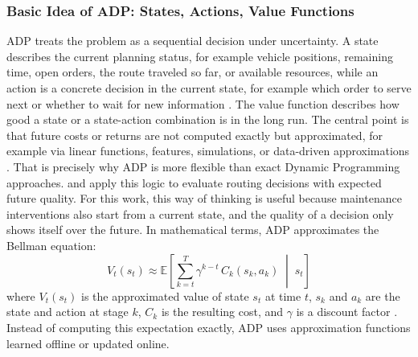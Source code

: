 \documentclass[12pt,oneside]{article}
\begin{document}
\subsubsection{Basic Idea of ADP: States, Actions, Value Functions}
ADP treats the problem as a sequential decision under uncertainty. A state describes the current planning status, for example vehicle positions, remaining time, open orders, the route traveled so far, or available resources, while an action is a concrete decision in the current state, for example which order to serve next or whether to wait for new information \citep{ulmer2017approximate, ulmer2019offline}.
The value function describes how good a state or a state-action combination is in the long run. The central point is that future costs or returns are not computed exactly but approximated, for example via linear functions, features, simulations, or data-driven approximations \citep{ulmer2017approximate, ulmer2020horizontal}. That is precisely why ADP is more flexible than exact Dynamic Programming approaches.
\citet{ulmer2017approximate} and \citet{ulmer2019offline} apply this logic to evaluate routing decisions with expected future quality. For this work, this way of thinking is useful because maintenance interventions also start from a current state, and the quality of a decision only shows itself over the future. In mathematical terms, ADP approximates the Bellman equation:
\[
  V_t(s_t) \approx \mathbb{E}\!\left[\sum_{k=t}^{T} \gamma^{k-t}\, C_k(s_k, a_k) \;\middle|\; s_t\right]
\]
where $V_t(s_t)$ is the approximated value of state $s_t$ at time $t$,
$s_k$ and $a_k$ are the state and action at stage $k$, $C_k$ is the resulting cost,
and $\gamma$ is a discount factor \citep{ulmer2017approximate}. Instead of computing this expectation exactly, ADP uses approximation functions learned offline or updated online.
\end{document}
